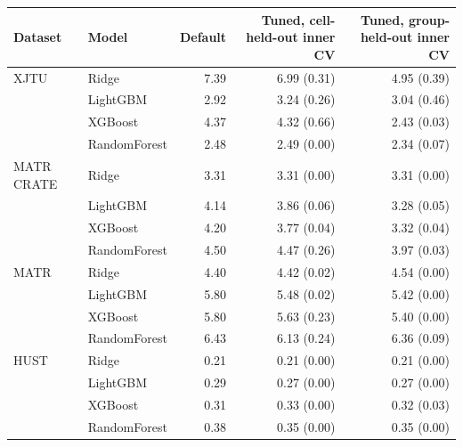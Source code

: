 \begin{tabular}{llrrr}
\toprule
Dataset & Model & Default & Tuned, cell-held-out inner CV & Tuned, group-held-out inner CV \\
\midrule
XJTU & Ridge & 7.39 & 6.99 (0.31) & 4.95 (0.39) \\
 & LightGBM & 2.92 & 3.24 (0.26) & 3.04 (0.46) \\
 & XGBoost & 4.37 & 4.32 (0.66) & 2.43 (0.03) \\
 & RandomForest & 2.48 & 2.49 (0.00) & 2.34 (0.07) \\
MATR CRATE & Ridge & 3.31 & 3.31 (0.00) & 3.31 (0.00) \\
 & LightGBM & 4.14 & 3.86 (0.06) & 3.28 (0.05) \\
 & XGBoost & 4.20 & 3.77 (0.04) & 3.32 (0.04) \\
 & RandomForest & 4.50 & 4.47 (0.26) & 3.97 (0.03) \\
MATR & Ridge & 4.40 & 4.42 (0.02) & 4.54 (0.00) \\
 & LightGBM & 5.80 & 5.48 (0.02) & 5.42 (0.00) \\
 & XGBoost & 5.80 & 5.63 (0.23) & 5.40 (0.00) \\
 & RandomForest & 6.43 & 6.13 (0.24) & 6.36 (0.09) \\
HUST & Ridge & 0.21 & 0.21 (0.00) & 0.21 (0.00) \\
 & LightGBM & 0.29 & 0.27 (0.00) & 0.27 (0.00) \\
 & XGBoost & 0.31 & 0.33 (0.00) & 0.32 (0.03) \\
 & RandomForest & 0.38 & 0.35 (0.00) & 0.35 (0.00) \\
\bottomrule
\end{tabular}
